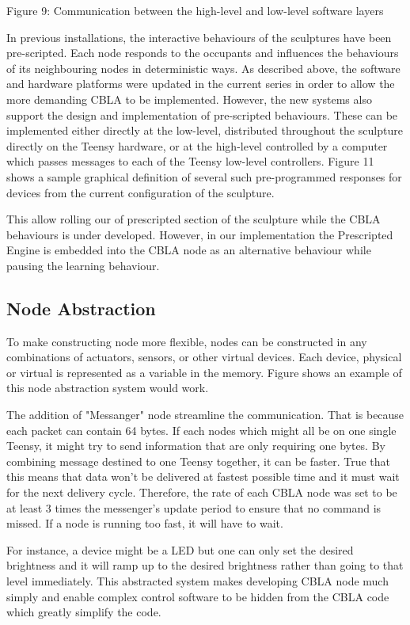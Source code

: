 Figure 9: Communication between the high-level and low-level software layers

In previous installations, the interactive behaviours of the sculptures have been pre-scripted. Each node responds to the occupants and influences the behaviours of its neighbouring nodes in deterministic ways.  As described above, the software and hardware platforms were updated in the current series in order to allow the more demanding CBLA to be implemented.  However, the new systems also support the design and implementation of pre-scripted behaviours.  These can be implemented either directly at the low-level, distributed throughout the sculpture directly on the Teensy hardware, or at the high-level controlled by a computer which passes messages to each of the Teensy low-level controllers.  Figure 11 shows a sample graphical definition of several such pre-programmed responses for devices from the current configuration of the sculpture.

This allow rolling our of prescripted section of the sculpture while the CBLA behaviours is under developed. 
However, in our implementation the Prescripted Engine is embedded into the CBLA node as an alternative behaviour while pausing the learning behaviour.


\subsection{Node Abstraction}

To make constructing node more flexible, nodes can be constructed in any combinations of actuators, sensors, or other virtual devices. Each device, physical or virtual is represented as a variable in the memory. Figure shows an example of this node abstraction system would work.

The addition of  "Messanger" node streamline the communication. That is because each packet can contain 64 bytes. If each nodes which might all be on one single Teensy, it might try to send information that are only requiring one bytes. By combining message destined to one Teensy together, it can be faster. True that this means that data won't be delivered at fastest possible time and it must wait for the next delivery cycle. Therefore, the rate of each CBLA node was set to be at least 3 times the messenger's update period to ensure that no command is missed. 
If a node is running too fast, it will have to wait. 

For instance, a device might be a LED but one can only set the desired brightness and it will ramp up to the desired brightness rather than going to that level immediately. This abstracted system makes developing CBLA node much simply and enable complex control software to be hidden from the CBLA code which greatly simplify the code. 


